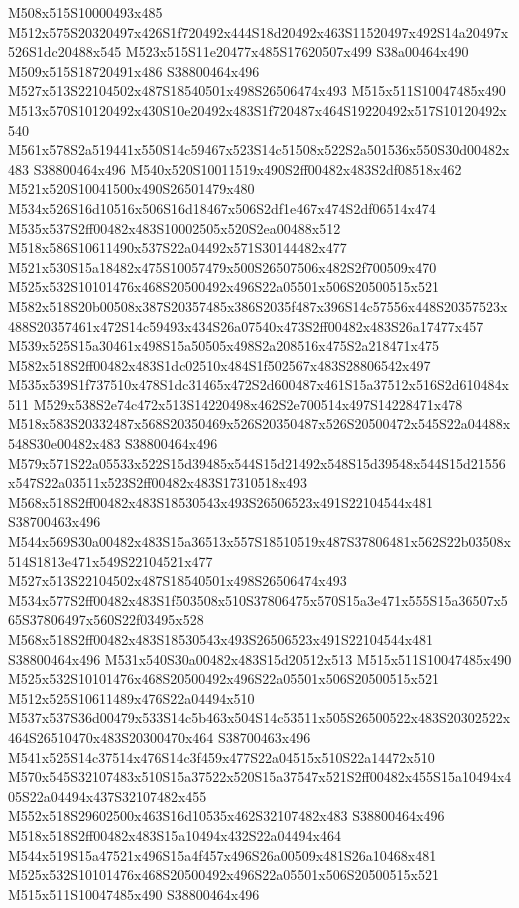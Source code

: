 \documentclass{article}
\begin{document}
\begin{multicols}{2}
M508x515S10000493x485 M512x575S20320497x426S1f720492x444S18d20492x463S11520497x492S14a20497x526S1dc20488x545 M523x515S11e20477x485S17620507x499 S38a00464x490 M509x515S18720491x486 S38800464x496 M527x513S22104502x487S18540501x498S26506474x493 M515x511S10047485x490 M513x570S10120492x430S10e20492x483S1f720487x464S19220492x517S10120492x540 M561x578S2a519441x550S14c59467x523S14c51508x522S2a501536x550S30d00482x483 S38800464x496 M540x520S10011519x490S2ff00482x483S2df08518x462 M521x520S10041500x490S26501479x480 M534x526S16d10516x506S16d18467x506S2df1e467x474S2df06514x474 M535x537S2ff00482x483S10002505x520S2ea00488x512 M518x586S10611490x537S22a04492x571S30144482x477 M521x530S15a18482x475S10057479x500S26507506x482S2f700509x470 M525x532S10101476x468S20500492x496S22a05501x506S20500515x521 M582x518S20b00508x387S20357485x386S2035f487x396S14c57556x448S20357523x488S20357461x472S14c59493x434S26a07540x473S2ff00482x483S26a17477x457 M539x525S15a30461x498S15a50505x498S2a208516x475S2a218471x475 M582x518S2ff00482x483S1dc02510x484S1f502567x483S28806542x497 M535x539S1f737510x478S1dc31465x472S2d600487x461S15a37512x516S2d610484x511 M529x538S2e74c472x513S14220498x462S2e700514x497S14228471x478 M518x583S20332487x568S20350469x526S20350487x526S20500472x545S22a04488x548S30e00482x483 S38800464x496 M579x571S22a05533x522S15d39485x544S15d21492x548S15d39548x544S15d21556x547S22a03511x523S2ff00482x483S17310518x493 M568x518S2ff00482x483S18530543x493S26506523x491S22104544x481 S38700463x496 M544x569S30a00482x483S15a36513x557S18510519x487S37806481x562S22b03508x514S1813e471x549S22104521x477 M527x513S22104502x487S18540501x498S26506474x493 M534x577S2ff00482x483S1f503508x510S37806475x570S15a3e471x555S15a36507x565S37806497x560S22f03495x528 M568x518S2ff00482x483S18530543x493S26506523x491S22104544x481 S38800464x496 M531x540S30a00482x483S15d20512x513 M515x511S10047485x490 M525x532S10101476x468S20500492x496S22a05501x506S20500515x521 M512x525S10611489x476S22a04494x510 M537x537S36d00479x533S14c5b463x504S14c53511x505S26500522x483S20302522x464S26510470x483S20300470x464 S38700463x496 M541x525S14c37514x476S14c3f459x477S22a04515x510S22a14472x510 M570x545S32107483x510S15a37522x520S15a37547x521S2ff00482x455S15a10494x405S22a04494x437S32107482x455 M552x518S29602500x463S16d10535x462S32107482x483 S38800464x496 M518x518S2ff00482x483S15a10494x432S22a04494x464 M544x519S15a47521x496S15a4f457x496S26a00509x481S26a10468x481 M525x532S10101476x468S20500492x496S22a05501x506S20500515x521 M515x511S10047485x490 S38800464x496


\end{multicols}
\end{document}
